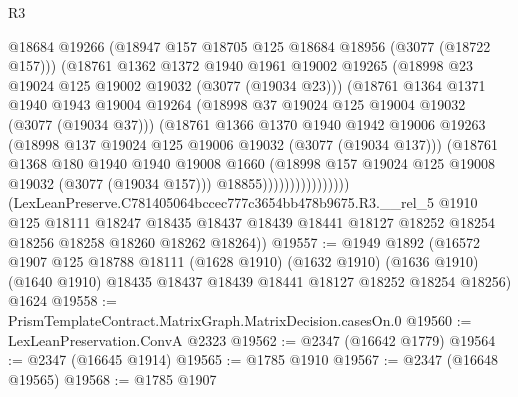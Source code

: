 \begin{lexlean}{R3}
\begin{coremodule}
                              @18684
                              @19266
                              (@18947 @157 @18705 @125 @18684 @18956 (@3077 (@18722 @157)))
                              (@18761
                                @1362
                                @1372
                                @1940
                                @1961
                                @19002
                                @19265
                                (@18998 @23 @19024 @125 @19002 @19032 (@3077 (@19034 @23)))
                                (@18761
                                  @1364
                                  @1371
                                  @1940
                                  @1943
                                  @19004
                                  @19264
                                  (@18998 @37 @19024 @125 @19004 @19032 (@3077 (@19034 @37)))
                                  (@18761
                                    @1366
                                    @1370
                                    @1940
                                    @1942
                                    @19006
                                    @19263
                                    (@18998 @137 @19024 @125 @19006 @19032 (@3077 (@19034 @137)))
                                    (@18761
                                      @1368
                                      @180
                                      @1940
                                      @1940
                                      @19008
                                      @1660
                                      (@18998 @157 @19024 @125 @19008 @19032 (@3077 (@19034 @157)))
                                      @18855))))))))))))))))
      (LexLeanPreserve.C781405064bccec777c3654bb478b9675.R3.__rel_5
        @1910
        @125
        @18111
        @18247
        @18435
        @18437
        @18439
        @18441
        @18127
        @18252
        @18254
        @18256
        @18258
        @18260
        @18262
        @18264))
@19557 := @1949
    @1892
    (@16572
      @1907
      @125
      @18788
      @18111
      (@1628 @1910)
      (@1632 @1910)
      (@1636 @1910)
      (@1640 @1910)
      @18435
      @18437
      @18439
      @18441
      @18127
      @18252
      @18254
      @18256)
    @1624
@19558 := PrismTemplateContract.MatrixGraph.MatrixDecision.casesOn.{0}
@19560 := LexLeanPreservation.ConvA @2323
@19562 := @2347 (@16642 @1779)
@19564 := @2347 (@16645 @1914)
@19565 := @1785 @1910
@19567 := @2347 (@16648 @19565)
@19568 := @1785 @1907

\end{coremodule}
\end{lexlean}

